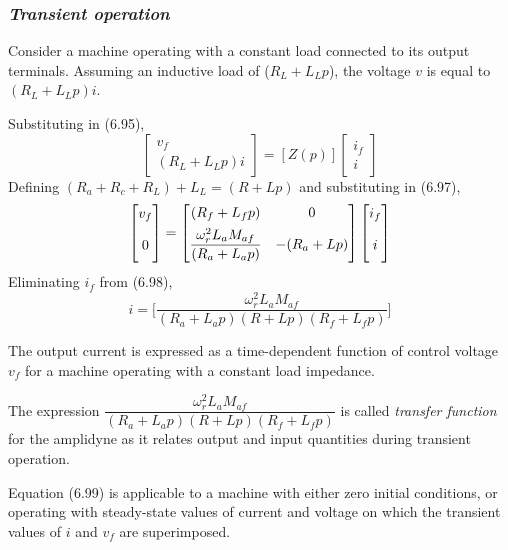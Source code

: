 \documentclass[a4paper,numbers=noenddot,12pt]{scrbook}
\begin{document}
\subsubsection{\textit{Transient operation}} Consider a machine operating with a constant load connected to its output terminals. Assuming an inductive load of ($R_L + L_L p$), the voltage $v$ is equal to $(R_L + L_L p)i$.

Substituting in (6.95),
\begin{equation}
    \begin{bmatrix}
        v_f \\ (R_L + L_L p)i
    \end{bmatrix}
    =
    [Z(p)]
    \begin{bmatrix}
        i_f \\ i
    \end{bmatrix}
    \label{eq:Eq6.97}
\end{equation}
Defining $(R_a + R_c + R_L) + L_L = (R + Lp)$ and substituting in (6.97),
\begin{equation}
    \begin{bmatrix}
        v_f \\[1ex] 0 \vphantom{\dfrac{M^2}{R_a}}
    \end{bmatrix}
    =
    \begin{bmatrix}
        (R_f + L_f p) & 0 \\[1ex]
        \dfrac{\omega_r^2 L_a M_{af}}{(R_a + L_a p)} & -(R_a + Lp)
    \end{bmatrix}
    \begin{bmatrix}
        i_f \\[1ex] i\vphantom{\dfrac{M^2}{R_a}}
    \end{bmatrix}
    \label{eq:Eq6.98}
\end{equation}
Eliminating $i_f$ from (6.98),
\begin{equation}
    i = \bigg[ \dfrac{\omega_r^2 L_a M_{af}}{(R_a + L_a p)(R + Lp)(R_f + L_f p)}\bigg] 
    \label{eq:Eq6.99}
\end{equation}

The output current is expressed as a time-dependent function of control voltage $v_f$ for a machine operating with a constant load impedance.

The expression $\dfrac{\omega_r^2 L_a M_{af}}{(R_a + L_a p)(R + L p)(R_f + L_f p)}$ is called \textit{transfer function} for the amplidyne as it relates output and input quantities during transient operation.

Equation (6.99) is applicable to a machine with either zero initial conditions, or operating with steady-state values of current and voltage on which the transient values of $i$ and $v_f$ are superimposed.
\end{document}
